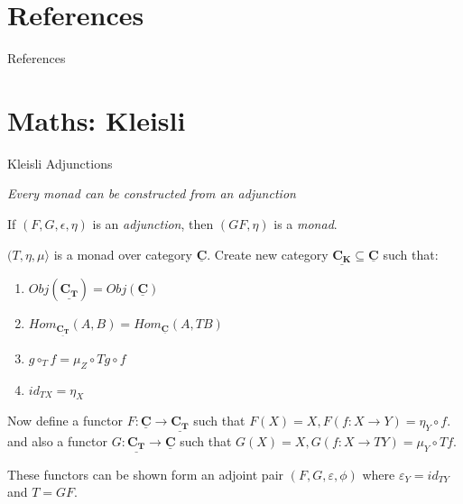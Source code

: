 \documentclass[10pt]{beamer}
\newcommand{\Cat}[1]{\ensuremath{\underline{\mathbf{#1}}}}
\theoremstyle{definition}
\theoremstyle{remark}
\numberwithin{equation}{section}
\begin{document}
\section{References}

\begin{frame}[allowframebreaks]{References}

  \nocite{Elkins2009}
  
  

\end{frame}

\section{Maths: Kleisli}

\begin{frame}[fragile]{Kleisli Adjunctions}

  \emph{Every monad can be constructed from an adjunction}

  If $(F,G,\epsilon,\eta)$ is an \emph{adjunction}, then $(GF,\eta)$ is a \emph{monad}.

  $(T,\eta,\mu〉$ is a monad over category $\Cat{C}$.
    Create new category $\Cat{C_K} \subseteq \Cat{C}$ such that:

    \begin{enumerate}
      \item $Obj(\Cat{C_T}) = Obj(\Cat{C})$
      \item $Hom_{\Cat{C_T}}(A,B) = Hom_{\Cat{C}}(A,T B)$
      \item $g \circ_{T} f = \mu_{Z} \circ T g \circ f $
      \item $id_{TX} = \eta_{X} $
    \end{enumerate}

    Now define a functor $ F : \Cat{C} \rightarrow \Cat{C_T} $ such that $ F(X) = X, F(f:X\rightarrow Y) = \eta_Y\circ f$.
    and also a functor $ G : \Cat{C_T} \rightarrow \Cat{C} $ such that $ G(X) = X, G(f:X\rightarrow TY) = \mu_Y\circ Tf$.

    These functors can be shown form an adjoint pair $(F,G,\varepsilon,\phi)$ where $\varepsilon_{Y} = id_{TY}$ and $T = GF$.
    
\end{frame}
\end{document}

